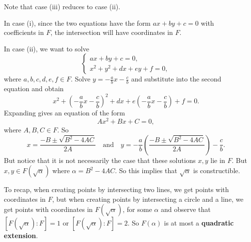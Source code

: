 Note that case (iii) reduces to case (ii).

\begin{center}
\end{center}

In case (i), since the two equations have the form $ax+by+c=0$ with coefficients in $F$, the intersection will have coordinates in $F$.

In case (ii), we want to solve
$$\begin{cases}
	ax+by+c=0,\\
	x^2+y^2+dx+ey+f=0,
\end{cases}$$
where $a,b,c,d,e,f\in F$. Solve $y=-\frac abx-\frac cb$ and substitute into the second equation and obtain
$$x^2+\left(-\frac abx-\frac cb\right)^2+dx+e\left(-\frac abx-\frac cb\right)+f=0.$$
Expanding gives an equation of the form
$$Ax^2+Bx+C=0,$$
where $A,B,C\in F$. So
$$x=\frac{-B\pm\sqrt{B^2-4AC}}{2A}\quad\text{and}\quad y=-\frac ab\left(\frac{-B\pm\sqrt{B^2-4AC}}{2A}\right)-\frac cb.$$
But notice that it is not necessarily the case that these solutions $x,y$ lie in $F$. But $x,y\in F(\sqrt\alpha)$ where $\alpha=B^2-4AC$. So this implies that $\sqrt\alpha$ is constructible.

To recap, when creating points by intersecting two lines, we get points with coordinates in $F$, but when creating points by intersecting a circle and a line, we get points with coordinates in $F(\sqrt\alpha)$, for some $\alpha$ and observe that $[F(\sqrt\alpha):F]=1$ or $[F(\sqrt\alpha):F]=2$. So $F(\alpha)$ is at most a \textbf{quadratic extension}.

